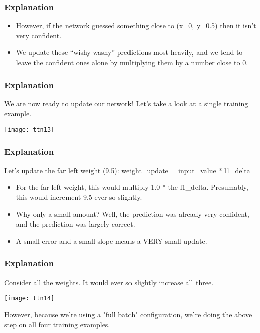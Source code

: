 \begin{frame}[fragile] \frametitle{Explanation}

\begin{itemize}
\item However, if the network guessed something close to (x=0, y=0.5) then it isn't very confident. 
\item We update these ``wishy-washy'' predictions most heavily, and we tend to leave the confident ones alone by multiplying them by a number close to 0. 
\end{itemize}
\end{frame}

\begin{frame}[fragile] \frametitle{Explanation}
We are now ready to update our network! Let's take a look at a single training example. 
\begin{center}
\texttt{[image: ttn13]}
\end{center}
\end{frame}

\begin{frame}[fragile] \frametitle{Explanation}
Let's update the far left weight (9.5): weight\_update = input\_value * l1\_delta
\begin{itemize}
\item For the far left weight, this would multiply 1.0 * the l1\_delta. Presumably, this would increment 9.5 ever so slightly. 
\item Why only a small amount? Well, the prediction was already very confident, and the prediction was largely correct.
\item  A small error and a small slope means a VERY small update. 
\end{itemize}
\end{frame}


\begin{frame}[fragile] \frametitle{Explanation}
Consider all the weights. It would ever so slightly increase all three. 
\begin{center}
\texttt{[image: ttn14]}
\end{center}
However, because we're using a "full batch" configuration, we're doing the above step on all four training examples. 
\end{frame}

